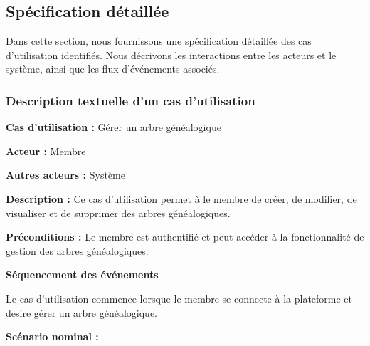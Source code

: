 \newpage

\subsection{Spécification détaillée }
Dans cette section, nous fournissons une spécification détaillée des cas
d’utilisation identifiés. Nous décrivons les interactions entre les acteurs et
le système, ainsi que les flux d’événements associés.

\subsubsection{Description textuelle d'un cas d'utilisation}
\textbf{Cas d’utilisation :} Gérer un arbre généalogique

\textbf{Acteur :} Membre

\textbf{Autres acteurs :} Système

\textbf{Description :} Ce cas d’utilisation permet à le membre de créer,
de modifier, de visualiser et de supprimer des arbres généalogiques.

\textbf{Préconditions :} Le membre est authentifié et peut accéder à la
fonctionnalité de gestion des arbres généalogiques.


\textbf{Séquencement des événements}

Le cas d’utilisation commence lorsque le membre se connecte à la plateforme
et desire gérer un arbre généalogique.

\textbf{Scénario nominal :}

